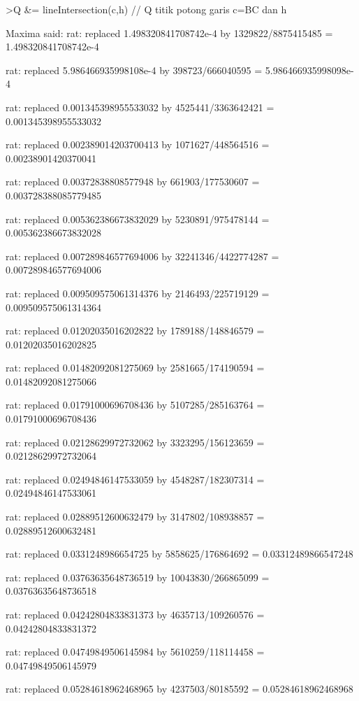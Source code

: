 \documentclass[a4paper,10pt]{article}
\begin{document}
\begin{eulernotebook}
\begin{eulercomment}
\begin{eulercomment}
\begin{eulercomment}
\begin{eulercomment}
\begin{eulercomment}
\begin{eulercomment}
\begin{eulercomment}
\begin{eulercomment}
\begin{eulercomment}
\begin{eulercomment}
\begin{eulercomment}
\begin{eulercomment}
\begin{eulercomment}
\begin{eulercomment}
\begin{eulercomment}
\begin{eulercomment}
\begin{euleroutput}
\end{euleroutput}
\begin{eulerprompt}
>Q &= lineIntersection(c,h) // Q titik potong garis c=BC dan h
\end{eulerprompt}
\begin{euleroutput}
  Maxima said:
  rat: replaced 1.498320841708742e-4 by 1329822/8875415485 = 1.498320841708742e-4
  
  rat: replaced 5.986466935998108e-4 by 398723/666040595 = 5.986466935998098e-4
  
  rat: replaced 0.001345398955533032 by 4525441/3363642421 = 0.001345398955533032
  
  rat: replaced 0.002389014203700413 by 1071627/448564516 = 0.00238901420370041
  
  rat: replaced 0.00372838808577948 by 661903/177530607 = 0.003728388085779485
  
  rat: replaced 0.005362386673832029 by 5230891/975478144 = 0.005362386673832028
  
  rat: replaced 0.007289846577694006 by 32241346/4422774287 = 0.007289846577694006
  
  rat: replaced 0.009509575061314376 by 2146493/225719129 = 0.009509575061314364
  
  rat: replaced 0.01202035016202822 by 1789188/148846579 = 0.01202035016202825
  
  rat: replaced 0.01482092081275069 by 2581665/174190594 = 0.01482092081275066
  
  rat: replaced 0.01791000696708436 by 5107285/285163764 = 0.01791000696708436
  
  rat: replaced 0.02128629972732062 by 3323295/156123659 = 0.02128629972732064
  
  rat: replaced 0.02494846147533059 by 4548287/182307314 = 0.02494846147533061
  
  rat: replaced 0.02889512600632479 by 3147802/108938857 = 0.02889512600632481
  
  rat: replaced 0.0331248986654725 by 5858625/176864692 = 0.03312489866547248
  
  rat: replaced 0.03763635648736519 by 10043830/266865099 = 0.03763635648736518
  
  rat: replaced 0.04242804833831373 by 4635713/109260576 = 0.04242804833831372
  
  rat: replaced 0.04749849506145984 by 5610259/118114458 = 0.04749849506145979
  
  rat: replaced 0.05284618962468965 by 4237503/80185592 = 0.05284618962468968
  

\end{euleroutput}
\end{eulercomment}
\end{eulercomment}
\end{eulercomment}
\end{eulercomment}
\end{eulercomment}
\end{eulercomment}
\end{eulercomment}
\end{eulercomment}
\end{eulercomment}
\end{eulercomment}
\end{eulercomment}
\end{eulercomment}
\end{eulercomment}
\end{eulercomment}
\end{eulercomment}
\end{eulercomment}
\end{eulernotebook}
\end{document}
